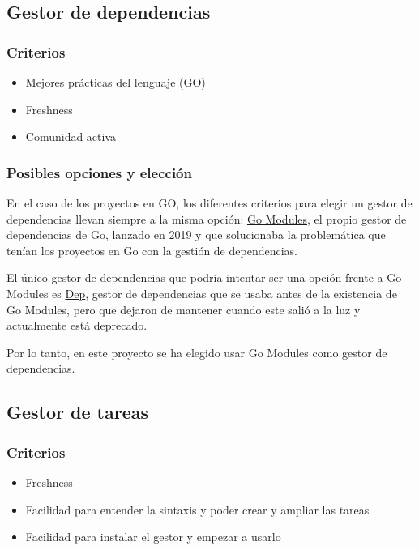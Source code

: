 \subsection{Gestor de dependencias}
\subsubsection{Criterios}

\begin{itemize}
\item
  Mejores prácticas del lenguaje (GO)
\item
  Freshness
\item
  Comunidad activa
\end{itemize}

\subsubsection{Posibles opciones y elección}

En el caso de los proyectos en GO, los diferentes criterios para elegir
un gestor de dependencias llevan siempre a la misma opción:
\href{https://go.dev/blog/using-go-modules}{Go Modules}, el propio
gestor de dependencias de Go, lanzado en 2019 y que solucionaba la
problemática que tenían los proyectos en Go con la gestión de
dependencias.

El único gestor de dependencias que podría intentar ser una opción
frente a Go Modules es \href{https://github.com/golang/dep}{Dep}, gestor
de dependencias que se usaba antes de la existencia de Go Modules, pero
que dejaron de mantener cuando este salió a la luz y actualmente está
deprecado.

Por lo tanto, en este proyecto se ha elegido usar Go Modules como gestor
de dependencias.

\newpage
\subsection{Gestor de tareas}
\subsubsection{Criterios}\label{criterios}

\begin{itemize}
\item
  Freshness
\item
  Facilidad para entender la sintaxis y poder crear y ampliar las tareas
\item
  Facilidad para instalar el gestor y empezar a usarlo
\end{itemize}

